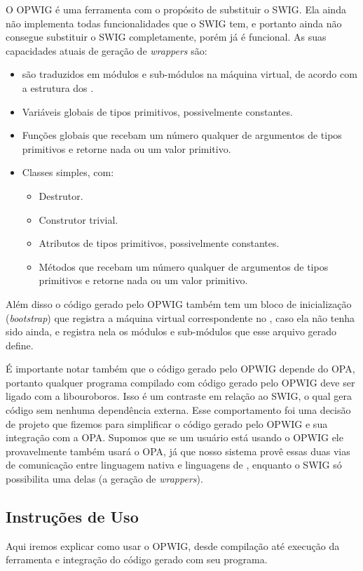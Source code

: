 O OPWIG é uma ferramenta com o propósito de substituir o SWIG.
Ela ainda não implementa todas funcionalidades que o SWIG tem, e portanto
ainda não consegue substituir o SWIG completamente, porém já é funcional.
As suas capacidades atuais de geração de \textit{wrappers} são:
\begin{itemize}
  \item {} são traduzidos em módulos e sub-módulos na máquina
    virtual, de acordo com a estrutura dos .
  \item Variáveis globais de tipos primitivos, possivelmente constantes.
  \item Funções globais que recebam um número qualquer de argumentos de tipos
    primitivos e retorne nada ou um valor primitivo.
  \item Classes simples, com:
    \begin{itemize}
      \item Destrutor.
      \item Construtor trivial.
      \item Atributos de tipos primitivos, possivelmente constantes.
      \item Métodos que recebam um número qualquer de argumentos de tipos
        primitivos e retorne nada ou um valor primitivo.
    \end{itemize}
\end{itemize}

Além disso o código gerado pelo OPWIG também tem um bloco de inicialização
(\textit{bootstrap}) que registra a máquina virtual correspondente no \SMgr{},
caso ela não tenha sido ainda, e registra nela os módulos e sub-módulos que esse
arquivo gerado define.

É importante notar também que o código gerado pelo OPWIG depende do OPA, 
portanto qualquer programa compilado com código gerado pelo OPWIG deve ser
ligado com a libouroboros. Isso é um contraste em relação ao SWIG, o qual gera
código sem nenhuma dependência externa. Esse comportamento foi uma decisão de
projeto que fizemos para simplificar o código gerado pelo OPWIG e sua integração
com a OPA. Supomos que se um usuário está usando o OPWIG ele provavelmente
também usará o OPA, já que nosso sistema provê essas duas vias de comunicação
entre linguagem nativa e linguagens de \script{}, enquanto o SWIG só possibilita
uma delas (a geração de \textit{wrappers}).

\subsection{Instruções de Uso}
Aqui iremos explicar como usar o OPWIG, desde compilação até execução da ferramenta
e integração do código gerado com seu programa.

